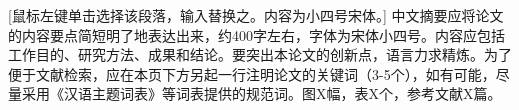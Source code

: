 \begin{chineseabstract}	

\noindent{}[鼠标左键单击选择该段落，输入替换之。内容为小四号宋体。] 中文摘要应将论文的内容要点简短明了地表达出来，约400字左右，字体为宋体小四号。内容应包括工作目的、研究方法、成果和结论。要突出本论文的创新点，语言力求精炼。为了便于文献检索，应在本页下方另起一行注明论文的关键词（3-5个），如有可能，尽量采用《汉语主题词表》等词表提供的规范词。图X幅，表X个，参考文献X篇。\par

	\vspace{2cm}
	
	\noindent {}
\end{chineseabstract}
